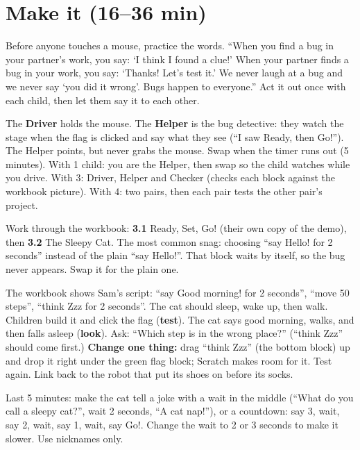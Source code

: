 \section{Make it (16--36 min)}
\begin{safety}
Before anyone touches a mouse, practice the words. \enquote{When you find a bug in your partner's work, you say: \enquote{I think I found a clue!} When your partner finds a bug in your work, you say: \enquote{Thanks! Let's test it.} We never laugh at a bug and we never say \enquote{you did it wrong}. Bugs happen to everyone.} Act it out once with each child, then let them say it to each other.
\end{safety}

\begin{pairroles}
The \textbf{Driver} holds the mouse. The \textbf{Helper} is the bug detective: they watch the stage when the flag is clicked and say what they see (\enquote{I saw Ready, then Go!}). The Helper points, but never grabs the mouse. Swap when the timer runs out (5 minutes). With 1 child: you are the Helper, then swap so the child watches while you drive. With 3: Driver, Helper and Checker (checks each block against the workbook picture). With 4: two pairs, then each pair tests the other pair's project.
\end{pairroles}

Work through the workbook: \textbf{3.1} Ready, Set, Go! (their own copy of the demo), then \textbf{3.2} The Sleepy Cat. The most common snag: choosing \enquote{say Hello! for 2 seconds} instead of the plain \enquote{say Hello!}. That block waits by itself, so the bug never appears. Swap it for the plain one.

\begin{bughunt}
The workbook shows Sam's script: \enquote{say Good morning! for 2 seconds}, \enquote{move 50 steps}, \enquote{think Zzz for 2 seconds}. The cat should sleep, wake up, then walk. Children build it and click the flag (\textbf{test}). The cat says good morning, walks, and then falls asleep (\textbf{look}). Ask: \enquote{Which step is in the wrong place?} (\enquote{think Zzz} should come first.) \textbf{Change one thing:} drag \enquote{think Zzz} (the bottom block) up and drop it right under the green flag block; Scratch makes room for it. Test again. Link back to the robot that put its shoes on before its socks.
\end{bughunt}

\begin{freebuild}
Last 5 minutes: make the cat tell a joke with a wait in the middle (\enquote{What do you call a sleepy cat?}, wait 2 seconds, \enquote{A cat nap!}), or a countdown: say 3, wait, say 2, wait, say 1, wait, say Go!. Change the wait to 2 or 3 seconds to make it slower. Use nicknames only.
\end{freebuild}

